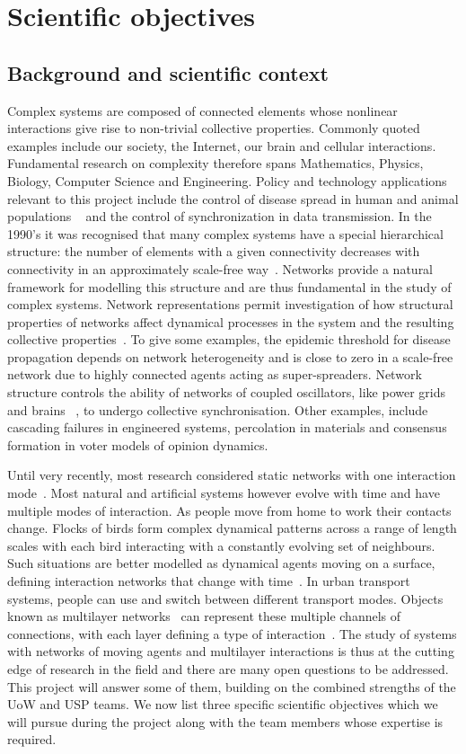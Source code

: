\section{Scientific objectives}
\label{sec-science}
\subsection{Background and scientific context}
Complex systems are composed of connected elements whose nonlinear interactions give
rise to non-trivial collective properties. Commonly quoted examples include our society, the 
Internet, our brain and cellular interactions. Fundamental
research on complexity therefore spans Mathematics, Physics, Biology,  Computer Science and 
Engineering. Policy and technology applications relevant to this project include the control of 
disease spread in human and animal populations ~\cite{Keeling08} and the control of 
synchronization in data transmission. In the 1990's it was
recognised that many complex systems have a special hierarchical structure: the number of elements
with a given connectivity decreases with connectivity in an approximately scale-free
way~\cite{Barabasi99}. Networks provide a natural framework for modelling this structure and
are thus fundamental in the study of complex systems. Network representations 
permit investigation of how structural properties
of networks affect dynamical processes in the system and the resulting collective properties~\cite{Barrat08}. To give some examples, the epidemic threshold for disease propagation depends on 
network  heterogeneity and is close to zero  in a scale-free network due to
highly connected agents acting as super-spreaders. Network structure controls the
ability of networks of coupled oscillators, like power grids and brains~\cite{Arenas08} ,
to undergo collective synchronisation. Other examples, include 
cascading failures in engineered systems, percolation in materials and consensus formation in
voter models of opinion dynamics. 

Until very recently, most research considered static networks with
one interaction mode~\cite{Costa011}. Most natural and 
artificial systems however evolve with time and have multiple modes of interaction.  
As people move from home to work their contacts  change. Flocks of birds form 
complex  dynamical patterns across a range of length scales with each bird interacting
with a constantly evolving set of neighbours. Such situations are better modelled as dynamical 
agents moving on a surface,  defining interaction networks that change with time~\cite{Buscarino08, 
Levis017}.  In urban transport systems, people can use and switch between different
transport modes.  Objects known as multilayer networks~\cite{Boccaletti014} can 
represent these multiple channels of connections, with each layer defining a  type of interaction~.  The study of systems with networks of moving agents and multilayer interactions is thus at the cutting edge of research in the field and there are many
open questions to be addressed. This project will answer some of them, building on the combined strengths of the UoW and USP teams. We now list three specific scientific objectives which
we will pursue during the project along with the team members whose expertise is required.

